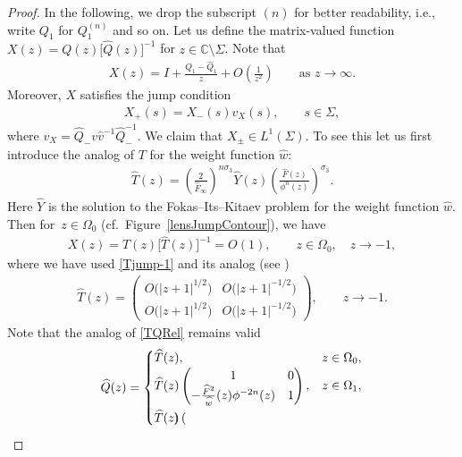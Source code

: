 \documentclass[10pt,a4paper]{amsart}
\newcommand{\C}{\mathbb{C}}
\newcommand{\Id}{I}
\newcommand{\hw}{\widehat w}
\newcommand{\bQ}{ Q}
\newcommand{\hQ}{{\widehat Q}}
\newcommand{\bv}{v}
\newcommand{\hv}{{\widehat v}}
\newcommand{\hF}{\widehat F}
\numberwithin{equation}{section}
\begin{document}
\begin{proof}
In the following, we drop the subscript $(n)$ for better readability, i.e., write $\bQ_1$ for $\bQ^{(n)}_1$ and so on. Let us define the matrix-valued function $X(z) = \bQ(z) \big[\hQ(z)\big]^{-1}$ for $z \in \C \setminus \Sigma$. Note that
\begin{align}\label{Rformula}
 X(z) = \Id + \frac{\bQ_1-\hQ_1}{z} + O\left(\frac{1}{z^2}\right) \qquad \text{as } z \to \infty.
\end{align}
Moreover, $X$ satisfies the jump condition
\begin{align*}
 X_+(s) = X_-(s)v_X(s), \qquad s\in \Sigma,
\end{align*}
where $v_X = \hQ_- \bv \hv^{-1} \hQ_-^{-1}$. We claim that $X_\pm \in L^1(\Sigma)$. To see this let us first introduce the analog of $T$ for the weight function $\hw$:
\begin{align*}
 \widehat T(z) = \left(\frac{2}{\hF_\infty}\right)^{n\sigma_3} \widehat Y(z) \left(\frac{\hF(z)}{\phi^n(z)}\right)^{\sigma_3}.
\end{align*}
Here $\hat Y$ is the solution to the Fokas--Its--Kitaev problem for the weight function $\hw$. Then for~${z \in \Omega_0}$ (cf.\ Figure~\ref{lensJumpContour}), we have
\begin{align*}%
 X(z) = T(z)\big[\widehat T(z)\big]^{-1} = O(1), \qquad z\in \Omega_0, \quad z\to-1,
\end{align*}
where we have used \eqref{Tjump-1} and its analog (see \cite[Section~2]{KMVV})
\begin{align}\label{hTjump-1}
 \widehat T(z) = \begin{pmatrix}
 O\big(|z+1|^{1/2}\big) & O\big(|z+1|^{-1/2}\big)
 \\
 O\big(|z+1|^{1/2}\big) & O\big(|z+1|^{-1/2}\big)
 \end{pmatrix}, \qquad z \to -1.
\end{align}
Note that the analog of \eqref{TQRel} remains valid
\begin{align*}
 \hQ(z) =
\begin{cases}
\widehat T(z), & z \in \Omega_0,
\\
\widehat T(z)
\begin{pmatrix}
1 & 0
\\
-\frac{\hF^2}{\hw}(z) \phi^{-2n}(z) & 1
\end{pmatrix},
& z \in \Omega_1,\vspace{1mm}
\\
\widehat T(z)
\begin{pmatrix}

\end{pmatrix}
\end{cases}
\end{align*}
\end{proof}
\end{document}
